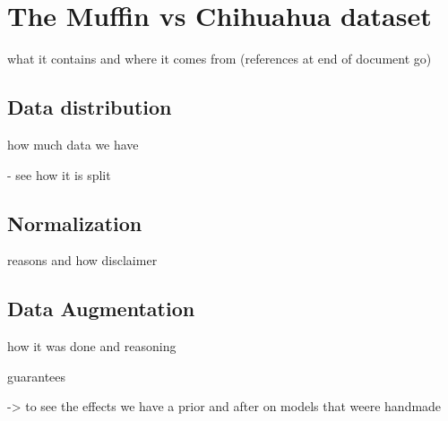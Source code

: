 \section{The Muffin vs Chihuahua dataset}

what it contains and where it comes from
(references at end of document go)

\subsection{Data distribution}
how much data we have

- see how it is split


\subsection{Normalization}
reasons and how
disclaimer

\subsection{Data Augmentation}
how it was done and reasoning

guarantees

-> to see the effects we have a prior and after on models that weere handmade
